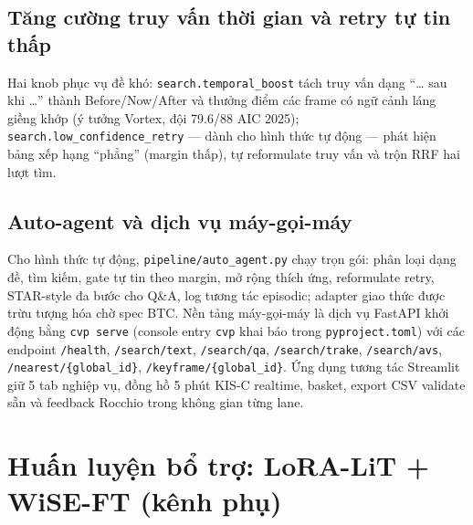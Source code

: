 \documentclass{ai_conquer2026}
\begin{document}
\subsection{Tăng cường truy vấn thời gian và retry tự tin thấp}
Hai knob phục vụ đề khó: \texttt{search.temporal\_boost} tách truy vấn dạng
``\ldots{} sau khi \ldots'' thành Before/Now/After và thưởng điểm các frame có ngữ cảnh
láng giềng khớp (ý tưởng Vortex, đội 79.6/88 AIC 2025); \texttt{search.low\_confidence\_retry}
--- dành cho hình thức tự động --- phát hiện bảng xếp hạng ``phẳng'' (margin thấp), tự
reformulate truy vấn và trộn RRF hai lượt tìm.

\subsection{Auto-agent và dịch vụ máy-gọi-máy}\label{sec:autoagent}
Cho hình thức tự động, \texttt{pipeline/auto\_agent.py} chạy trọn gói: phân loại dạng đề,
tìm kiếm, gate tự tin theo margin, mở rộng thích ứng, reformulate retry, STAR-style
đa bước cho Q\&A, log tương tác episodic; adapter giao thức được trừu tượng hóa chờ spec
BTC. Nền tảng máy-gọi-máy là dịch vụ FastAPI khởi động bằng \texttt{cvp serve}
(console entry \texttt{cvp} khai báo trong \texttt{pyproject.toml}) với các endpoint
\texttt{/health}, \texttt{/search/text}, \texttt{/search/qa}, \texttt{/search/trake},
\texttt{/search/avs}, \texttt{/nearest/\{global\_id\}}, \texttt{/keyframe/\{global\_id\}}.
Ứng dụng tương tác Streamlit giữ 5 tab nghiệp vụ, đồng hồ 5 phút KIS-C realtime, basket,
export CSV validate sẵn và feedback Rocchio trong không gian từng lane.

\section{Huấn luyện bổ trợ: LoRA-LiT + WiSE-FT (kênh phụ)}\label{sec:training}
\end{document}

